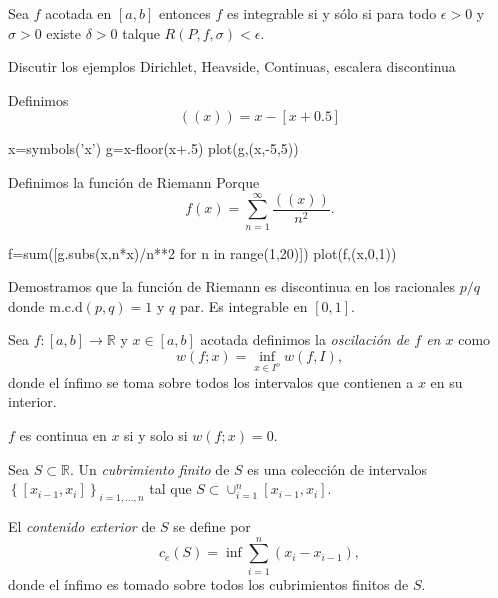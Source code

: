 \begin{teorema}{} Sea $f$ acotada en $[a,b]$ entonces $f$ es integrable si y sólo si  para todo $\epsilon>0$ y $\sigma>0$ existe $\delta>0$ talque $R(P,f,\sigma)<\epsilon$.
\end{teorema}

\begin{ejemplo}{} Discutir los ejemplos Dirichlet, Heavside, Continuas, escalera discontinua
 
\end{ejemplo}

\begin{ejemplo}{} Definimos
\[
 ((x))=x-[x+0.5]
\]

\begin{sympyverbatim}
x=symbols('x')
g=x-floor(x+.5)
plot(g,(x,-5,5))
\end{sympyverbatim}
Definimos la función de Riemann Porque
\[
 f(x)=\sum_{n=1}^{\infty}\frac{((x))}{n^2}.
\]

\begin{sympyverbatim}
f=sum([g.subs(x,n*x)/n**2 for n in range(1,20)])
plot(f,(x,0,1))
\end{sympyverbatim}
 
Demostramos que la función de Riemann es discontinua en los racionales $p/q$ donde $\text{m.c.d}(p,q)=1$ y $q$ par. Es integrable en $[0,1]$.  
 
\end{ejemplo}


\begin{definicion}{} 
Sea $f:[a,b]\to\mathbb{R}$ y $x\in [a,b]$ 
acotada definimos la {\em oscilación de $f$ en $x$} como 
\[
 w(f;x)=\inf\limits_{x\in I^o}w(f,I),
\]
donde el ínfimo se toma sobre todos los intervalos que contienen a $x$ en su interior.
\end{definicion}

\begin{ejercicio}{} $f$ es continua en $x$ si y solo si $w(f;x)=0$.
 \end{ejercicio}

 \begin{definicion}{} Sea $S\subset\mathbb{R}$. Un \emph{cubrimiento finito} de $S$ es una colección de intervalos $\left\{ [x_{i-1},x_i]\right\}_{i=1,\ldots,n}$ tal que $S\subset \cup_{i=1}^n[x_{i-1},x_i]$.
 
 El \emph{contenido exterior} de $S$ se define por 
 \[
  c_e(S)=\inf \sum_{i=1}^n (x_i-x_{i-1}),
 \]
donde el ínfimo es tomado sobre todos los cubrimientos finitos de $S$.
  
 \end{definicion}
 
